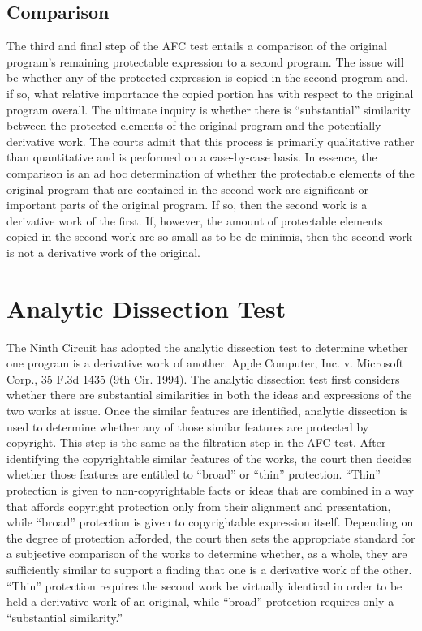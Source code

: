 \subsection{Comparison}

The third and final step of the AFC test entails a comparison of the
original program's remaining protectable expression to a second
program. The issue will be whether any of the protected expression is
copied in the second program and, if so, what relative importance the
copied portion has with respect to the original program overall. The
ultimate inquiry is whether there is ``substantial'' similarity between
the protected elements of the original program and the potentially
derivative work. The courts admit that this process is primarily
qualitative rather than quantitative and is performed on a case-by-case
basis. In essence, the comparison is an ad hoc determination of whether
the protectable elements of the original program that are contained in the
second work are significant or important parts of the original program. If
so, then the second work is a derivative work of the first. If, however,
the amount of protectable elements copied in the second work are so small
as to be de minimis, then the second work is not a derivative work of the
original.

\section{Analytic Dissection Test}

The Ninth Circuit has adopted the analytic dissection test to determine
whether one program is a derivative work of another. Apple Computer,
Inc. v. Microsoft Corp., 35 F.3d 1435 (9th Cir. 1994). The analytic
dissection test first considers whether there are substantial similarities
in both the ideas and expressions of the two works at issue. Once the
similar features are identified, analytic dissection is used to determine
whether any of those similar features are protected by copyright. This
step is the same as the filtration step in the AFC test. After identifying
the copyrightable similar features of the works, the court then decides
whether those features are entitled to ``broad'' or ``thin''
protection. ``Thin'' protection is given to non-copyrightable facts or
ideas that are combined in a way that affords copyright protection only
from their alignment and presentation, while ``broad'' protection is given
to copyrightable expression itself. Depending on the degree of protection
afforded, the court then sets the appropriate standard for a subjective
comparison of the works to determine whether, as a whole, they are
sufficiently similar to support a finding that one is a derivative work of
the other. ``Thin'' protection requires the second work be virtually
identical in order to be held a derivative work of an original, while
``broad'' protection requires only a ``substantial similarity.''

